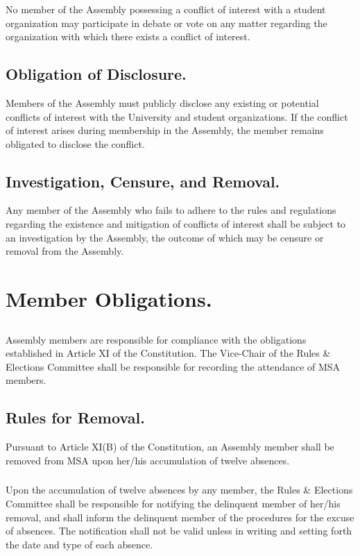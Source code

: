 \subsubsection{}
No member of the Assembly possessing a conflict of interest with a student organization may participate in debate or vote on any matter regarding the organization with which there exists a conflict of interest.

\subsection{Obligation of Disclosure.}
Members of the Assembly must publicly disclose any existing or potential conflicts of interest with the University and student organizations.  If the conflict of interest arises during membership in the Assembly, the member remains obligated to disclose the conflict.

\subsection{Investigation, Censure, and Removal.}
Any member of the Assembly who fails to adhere to the rules and regulations regarding the existence and mitigation of conflicts of interest shall be subject to an investigation by the Assembly, the outcome of which may be censure or removal from the Assembly.


\section{Member Obligations.}

\subsection{}
Assembly members are responsible for compliance with the obligations established in Article XI of the Constitution.  The Vice-Chair of the Rules \& Elections Committee shall be responsible for recording the attendance of MSA members.

\subsection{Rules for Removal.}
Pursuant to Article XI(B) of the Constitution, an Assembly	 member shall be removed from MSA upon her/his accumulation of twelve absences.
\subsubsection{}
Upon the accumulation of twelve absences by any member, the Rules \& Elections Committee shall be responsible for notifying the delinquent member of her/his removal, and shall inform the delinquent member of the procedures for the excuse of absences.  The notification shall not be valid unless in writing and setting forth the date and type of each absence.

